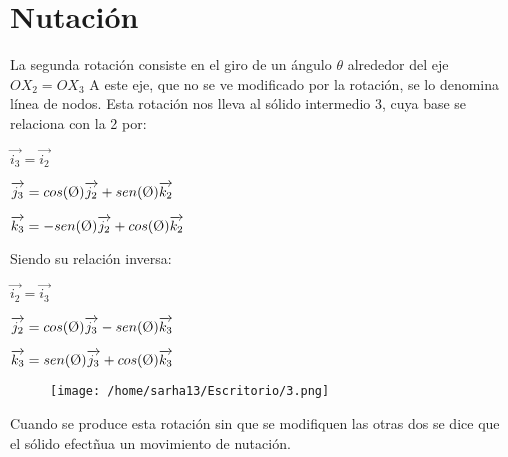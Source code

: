 \documentclass[12pt,a4paper]{report}
\begin{document}
\section{Nutación}
La segunda rotación consiste en el giro de un ángulo $\theta$ alrededor del eje $OX_{2}=OX_{3}$ A este eje, que no se ve modificado por la rotación, se lo denomina línea de nodos. Esta rotación nos lleva al sólido intermedio 3, cuya base se relaciona con la 2 por:
\begin{center}
$\overrightarrow{i_{3}}=\overrightarrow{i_{2}}$

$\overrightarrow{j_{3}}=cos(\textrm \O)\overrightarrow{j_{2}}+sen(\textrm \O)\overrightarrow{k_{2}}$

$\overrightarrow{k_{3}}=-sen(\textrm \O)\overrightarrow{j_{2}}+cos(\textrm \O)\overrightarrow{k_{2}}$
\end{center}
Siendo su relación inversa:
\begin{center}
$\overrightarrow{i_{2}}=\overrightarrow{i_{3}}$

$\overrightarrow{j_{2}}=cos(\textrm \O)\overrightarrow{j_{3}}-sen(\textrm \O)\overrightarrow{k_{3}}$

$\overrightarrow{k_{3}}=sen(\textrm \O)\overrightarrow{j_{3}}+cos(\textrm \O)\overrightarrow{k_{3}}$
\end{center}
\begin{center}

\begin{figure}[htp]
\centering
\texttt{[image: /home/sarha13/Escritorio/3.png]}
\caption{}
\label{}
\end{figure}

Cuando se produce esta rotación sin que se modifiquen las otras dos se dice que el sólido efectñua un movimiento de nutación.
\end{center} 
\end{document}
